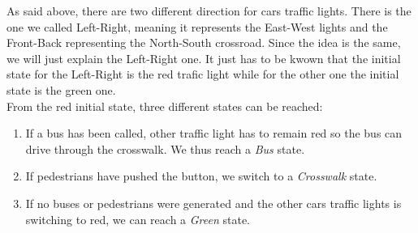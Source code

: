 As said above, there are two different direction for cars traffic lights. There is the one we called Left-Right, meaning it represents the East-West lights and the Front-Back representing the North-South crossroad. Since the idea is the same, we will just explain the Left-Right one. It just has to be kwown that the initial state for the Left-Right is the red trafic light while for the other one the initial state is the green one. \\

From the red initial state, three different states can be reached:
\begin{enumerate}
  \item If a bus has been called, other traffic light has to remain red so the bus can drive through the crosswalk. We thus reach a \textit{Bus} state.
  \item If pedestrians have pushed the button, we switch to a \textit{Crosswalk} state.
  \item If no buses or pedestrians were generated and the other cars traffic lights is switching to red, we can reach a \textit{Green} state.
\end{enumerate}

